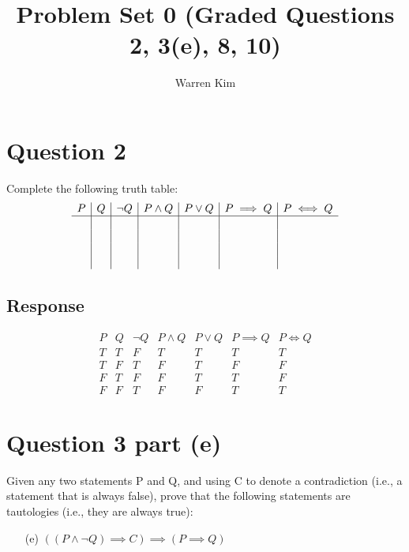 \documentclass[13pt]{article}
\title{Problem Set 0 (Graded Questions 2, 3(e), 8, 10)}
\author{Warren Kim}
\begin{document}
\maketitle

\newpage
\section*{Question 2}
Complete the following truth table:
\[
  \begin{array}{c|c|c|c|c|c|c}
    P & Q & \neg Q & P \land Q & P \lor Q & P \implies Q & P \iff Q \\
    \hline
      &  &  &  &  &  &  \\
      &  &  &  &  &  &  \\
      &  &  &  &  &  &  \\
      &  &  &  &  &  & 
  \end{array}
\]

\subsection*{Response}
\[
  \begin{array}{c|c|c|c|c|c|c}
    P & Q & \neg Q & P \land Q & P \lor Q & P \implies Q & P \iff Q \\
    \hline
    T & T & F & T & T & T & T \\
    T & F & T & F & T & F & F \\
    F & T & F & F & T & T & F \\
    F & F & T & F & F & T & T
  \end{array}
\]





\newpage
\section*{Question 3 part (e)}
Given any two statements P and Q, and using C to denote a contradiction (i.e., a
statement that is always false), prove that the following statements are tautologies (i.e.,
they are always true):
\begin{enumerate}
\item [(e)] $((P \land \neg Q) \implies C) \implies (P \implies Q)$
\end{enumerate}
\end{document}
